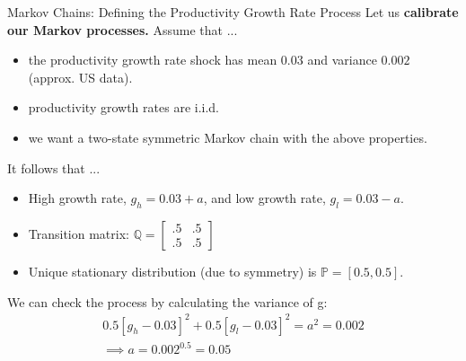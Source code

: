 \documentclass[10pt,c,aspectratio=1610,handout]{beamer}
\begin{document}
\begin{frame}{Markov Chains: Defining the Productivity Growth Rate Process}%
  Let us \textbf{calibrate our Markov processes.} Assume that ...%
  \pause%
  \begin{itemize}%
    \item[$\blacktriangleright$] the productivity growth rate shock has mean $0.03$ and variance $0.002$ (approx. US data).%
    \item[$\blacktriangleright$] productivity growth rates are i.i.d.%
    \item[$\blacktriangleright$] we want a two-state symmetric Markov chain with the above properties.%
  \end{itemize}%
  \pause%
  It follows that ...%
  \begin{itemize}%
    \item[$\blacktriangleright$] High growth rate, $g_h = 0.03+a$, and low growth rate, $g_l = 0.03-a$.%
    \item[$\blacktriangleright$] Transition matrix: $\mathbb{Q} = \left [ \begin{array}{cc} .5 & .5 \\ .5 & .5  \end{array} \right ]$%
    \item[$\blacktriangleright$] Unique stationary distribution (due to symmetry) is $\mathbb{P} = [0.5, 0.5]$.%
  \end{itemize}%
  \pause%
  We can check the process by calculating the variance of g:%
  \begin{gather*} 0.5 [g_h - 0.03 ] ^2 + 0.5 [g_l - 0.03]^2 = a^2 = 0.002 \\%
    \implies a = 0.002^{0.5} = 0.05%
  \end{gather*}\\%
  \vspace*{-0.2in}%
\end{frame}%
\end{document}

